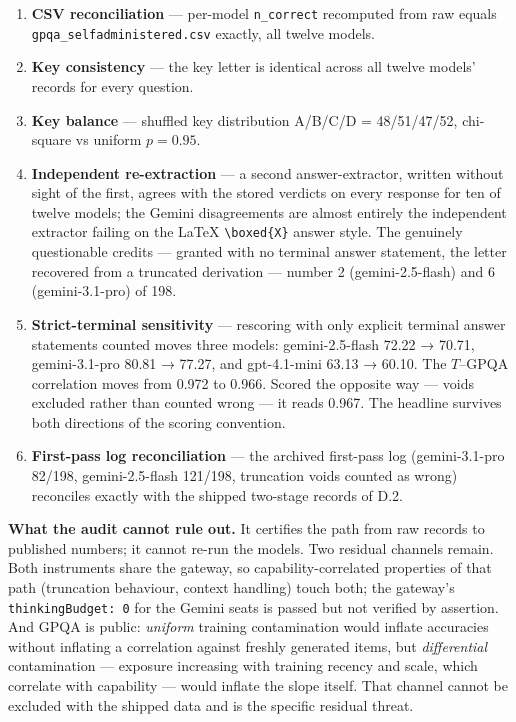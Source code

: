\begin{enumerate}
\def\labelenumi{\arabic{enumi}.}
\tightlist
\item
  \textbf{CSV reconciliation} --- per-model \texttt{n\_correct} recomputed from raw equals \texttt{gpqa\_selfadministered.csv} exactly, all twelve models.
\item
  \textbf{Key consistency} --- the key letter is identical across all twelve models' records for every question.
\item
  \textbf{Key balance} --- shuffled key distribution A/B/C/D = 48/51/47/52, chi-square vs uniform \(p = 0.95\).
\item
  \textbf{Independent re-extraction} --- a second answer-extractor, written without sight of the first, agrees with the stored verdicts on every response for ten of twelve models; the Gemini disagreements are almost entirely the independent extractor failing on the LaTeX \texttt{\textbackslash{}boxed\{X\}} answer style. The genuinely questionable credits --- granted with no terminal answer statement, the letter recovered from a truncated derivation --- number 2 (gemini-2.5-flash) and 6 (gemini-3.1-pro) of 198.
\item
  \textbf{Strict-terminal sensitivity} --- rescoring with only explicit terminal answer statements counted moves three models: gemini-2.5-flash 72.22 → 70.71, gemini-3.1-pro 80.81 → 77.27, and gpt-4.1-mini 63.13 → 60.10. The \(T\)--GPQA correlation moves from 0.972 to 0.966. Scored the opposite way --- voids excluded rather than counted wrong --- it reads 0.967. The headline survives both directions of the scoring convention.
\item
  \textbf{First-pass log reconciliation} --- the archived first-pass log (gemini-3.1-pro 82/198, gemini-2.5-flash 121/198, truncation voids counted as wrong) reconciles exactly with the shipped two-stage records of D.2.
\end{enumerate}

\textbf{What the audit cannot rule out.} It certifies the path from raw records to published numbers; it cannot re-run the models. Two residual channels remain. Both instruments share the gateway, so capability-correlated properties of that path (truncation behaviour, context handling) touch both; the gateway's \texttt{thinkingBudget:\ 0} for the Gemini seats is passed but not verified by assertion. And GPQA is public: \emph{uniform} training contamination would inflate accuracies without inflating a correlation against freshly generated items, but \emph{differential} contamination --- exposure increasing with training recency and scale, which correlate with capability --- would inflate the slope itself. That channel cannot be excluded with the shipped data and is the specific residual threat.

